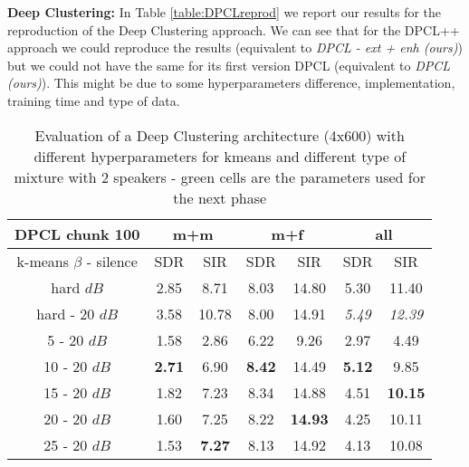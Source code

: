 \documentclass[master,final,11pt]{iscs-thesis}
\begin{document}
\textbf{Deep Clustering:} In Table \ref{table:DPCLreprod} we report our results for the reproduction of the Deep Clustering approach. We can see that for the DPCL++ \cite{DPCLV2} approach we could reproduce the results (equivalent to \textit{DPCL - ext + enh (ours)}) but we could not have the same for its first version DPCL \cite{DPCLV1} (equivalent to \textit{DPCL (ours)}). This might be due to some hyperparameters difference, implementation, training time and type of data.

\begin{table}[ht]
\centering
\begin{tabular}{c|c|c|c|c|c|c}
DPCL chunk 100 & \multicolumn{2}{c|}{m+m} & \multicolumn{2}{c|}{m+f} & \multicolumn{2}{c}{all} \\ 
\hline 
k-means $\beta$ - silence & SDR & SIR & SDR & SIR & SDR & SIR \\ 
\hline 
hard $dB$ & 2.85 & 8.71 & 8.03 & 14.80 & 5.30 & 11.40 \\ 
hard - 20 $dB$ & 3.58 & 10.78 & 8.00 & 14.91 & \textit{5.49} & \textit{12.39} \\ 
\hline 
\hline 
5 - 20 $dB$ & 1.58 & 2.86 & 6.22 & 9.26 & 2.97 & 4.49 \\ 
10 - 20 $dB$ &  \cellcolor{green}\textbf{2.71} & \cellcolor{green}6.90 & \cellcolor{green}\textbf{8.42} &\cellcolor{green} 14.49 & \cellcolor{green}\textbf{5.12} & \cellcolor{green}9.85 \\ 
15 - 20 $dB$ & 1.82 & 7.23 & 8.34 & 14.88 & 4.51 & \textbf{10.15} \\ 
20 - 20 $dB$ & 1.60 & 7.25 & 8.22 & \textbf{14.93} & 4.25 & 10.11 \\ 
25 - 20 $dB$ & 1.53 & \textbf{7.27} & 8.13 & 14.92 & 4.13 & 10.08 \\ 
\end{tabular}
\captionsetup{justification=centering}
\caption{Evaluation of a Deep Clustering architecture (4x600) with different hyperparameters for kmeans and different type of mixture with 2 speakers - green cells are the parameters used for the next phase}
\label{table:DPCLV1}
\end{table}
\end{document}
